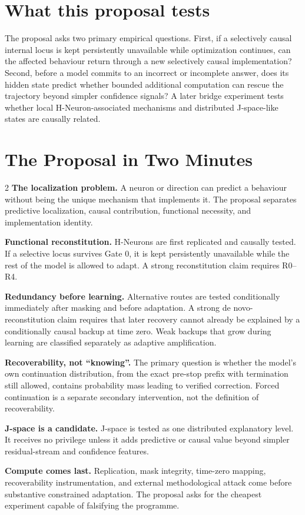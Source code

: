 \documentclass[11pt,a4paper]{article}
\begin{document}
\section*{What this proposal tests}
The proposal asks two primary empirical questions. First, if a selectively causal internal locus is kept persistently unavailable while optimization continues, can the affected behaviour return through a new selectively causal implementation? Second, before a model commits to an incorrect or incomplete answer, does its hidden state predict whether bounded additional computation can rescue the trajectory beyond simpler confidence signals? A later bridge experiment tests whether local H-Neuron-associated mechanisms and distributed J-space-like states are causally related.

\clearpage
\section*{The Proposal in Two Minutes}
\begin{multicols}{2}
\textbf{The localization problem.} A neuron or direction can predict a behaviour without being the unique mechanism that implements it. The proposal separates predictive localization, causal contribution, functional necessity, and implementation identity.

\textbf{Functional reconstitution.} H-Neurons are first replicated and causally tested. If a selective locus survives Gate 0, it is kept persistently unavailable while the rest of the model is allowed to adapt. A strong reconstitution claim requires R0--R4.

\textbf{Redundancy before learning.} Alternative routes are tested conditionally immediately after masking and before adaptation. A strong de novo-reconstitution claim requires that later recovery cannot already be explained by a conditionally causal backup at time zero. Weak backups that grow during learning are classified separately as adaptive amplification.

\columnbreak

\textbf{Recoverability, not ``knowing''.} The primary question is whether the model's own continuation distribution, from the exact pre-stop prefix with termination still allowed, contains probability mass leading to verified correction. Forced continuation is a separate secondary intervention, not the definition of recoverability.

\textbf{J-space is a candidate.} J-space is tested as one distributed explanatory level. It receives no privilege unless it adds predictive or causal value beyond simpler residual-stream and confidence features.

\textbf{Compute comes last.} Replication, mask integrity, time-zero mapping, recoverability instrumentation, and external methodological attack come before substantive constrained adaptation. The proposal asks for the cheapest experiment capable of falsifying the programme.
\end{multicols}
\end{document}
